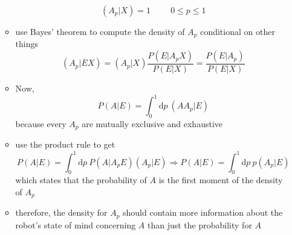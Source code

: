 \documentclass[../jaynes_prob_theory_notes.tex]{subfiles}
\begin{document}
\begin{itemize}
\begin{itemize}
                        \begin{equation*} 
                            (A_p|X) = 1 \hspace{1cm} 0 \leq p \leq 1
                        \end{equation*}
                    \item use Bayes' theorem to compute the density of \(A_p\) conditional on other things
                        \begin{equation*} 
                            (A_p|EX) = (A_p|X) \frac{P(E|A_p X)}{P(E|X)} = \frac{P(E|A_p)}{P(E|X)}
                        \end{equation*}
                    \item Now, 
                        \begin{equation*} 
                            P(A|E) = \int^{1}_{0} \text{d}p~(AA_p | E)
                        \end{equation*}
                        because every \(A_p\) are mutually exclusive and exhaustive
                    \item use the product rule to get
                        \begin{equation*} 
                            P(A|E) = \int^{1}_{0} \text{d}p~P(A|A_p E)(A_p|E) \Rightarrow P(A|E) = \int^{1}_{0} \text{d}p~p(A_p|E)
                        \end{equation*}
                        which states that the probability of \(A\) is the first moment of the density of \(A_p\)
                    \item therefore, the density for \(A_p\) should contain more information about the robot's state of mind concerning \(A\) than just the probability for \(A\)
                \end{itemize}
        \end{itemize}
\end{document}
